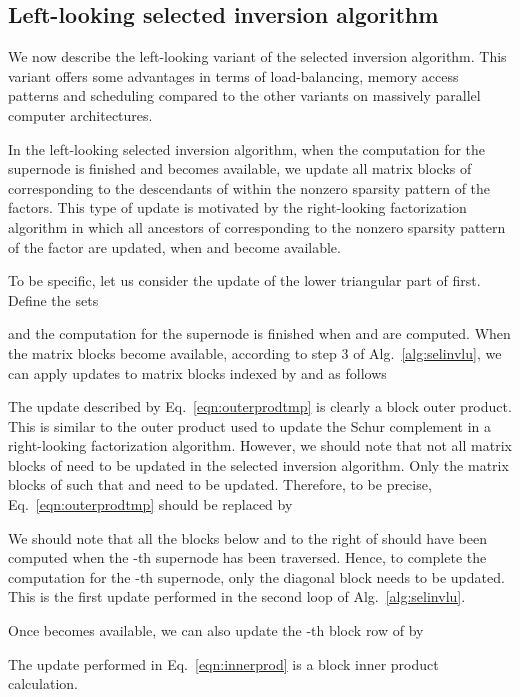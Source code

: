 \documentclass[10pt, conference, compsocconf,letterpaper,twocolumn]{IEEEtran}
\begin{document}
\subsection{Left-looking selected inversion algorithm}

We now describe the left-looking variant of the selected inversion algorithm. 
This variant offers some advantages in terms of
load-balancing, memory access patterns and scheduling compared to the
other variants on massively parallel computer architectures.

In the left-looking selected inversion algorithm, when the computation for the supernode  is finished
and  
becomes available,  
we update 
all matrix blocks of  corresponding to the  descendants of  within the nonzero sparsity pattern of the  factors.
This type of update is motivated by 
the right-looking factorization algorithm in which all ancestors of
  corresponding to the nonzero sparsity pattern of the  factor are updated, when  and  become available. 


To be specific, let us consider the update of the lower triangular part 
of  first. Define the sets

and the computation for the supernode  is finished when  and  are computed.
When the matrix blocks  become available, according to step 3 of Alg.~\ref{alg:selinvlu}, we can apply
updates to matrix blocks indexed by  and  as follows

The update described by Eq.~\eqref{eqn:outerprodtmp} is clearly a block outer 
product. This is similar to the outer product used to update the Schur
complement in a right-looking factorization algorithm.
However, we should note that not all matrix blocks of  
need to be updated in the selected inversion algorithm. Only the 
matrix blocks of  such that 
and  need to be updated. Therefore, to be precise,
Eq.~\eqref{eqn:outerprodtmp} should be replaced by


We should note that all the blocks below and to the right of 
should have been computed when the -th supernode has been traversed.
Hence, to complete the computation for the
-th supernode, only the diagonal block 
needs to be updated.  This is the first update performed in the
second loop of Alg.~\ref{alg:selinvlu}.

Once  becomes available, we can also update the
-th block row of  by

The update performed in Eq.~\eqref{eqn:innerprod} is a block inner product
calculation.
\end{document}
